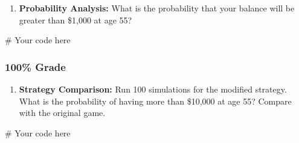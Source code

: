 \documentclass[
  letterpaper,
  DIV=11,
  numbers=noendperiod]{scrartcl}
\newenvironment{Shaded}{\begin{snugshade}}{\end{snugshade}}
\newcommand{\CommentTok}[1]{\textcolor[rgb]{0.37,0.37,0.37}{#1}}
\providecommand{\tightlist}{%
  \setlength{\itemsep}{0pt}\setlength{\parskip}{0pt}}
\begin{document}
\begin{enumerate}
\def\labelenumi{\arabic{enumi}.}
\setcounter{enumi}{4}
\tightlist
\item
  \textbf{Probability Analysis:} What is the probability that your
  balance will be greater than \$1,000 at age 55?
\end{enumerate}

\begin{Shaded}
\begin{Highlighting}[]
\CommentTok{\# Your code here}
\end{Highlighting}
\end{Shaded}

\subsubsection{100\% Grade}\label{grade-3}

\begin{enumerate}
\def\labelenumi{\arabic{enumi}.}
\setcounter{enumi}{5}
\tightlist
\item
  \textbf{Strategy Comparison:} Run 100 simulations for the modified
  strategy. What is the probability of having more than \$10,000 at age
  55? Compare with the original game.
\end{enumerate}

\begin{Shaded}
\begin{Highlighting}[]
\CommentTok{\# Your code here}
\end{Highlighting}
\end{Shaded}
\end{document}
